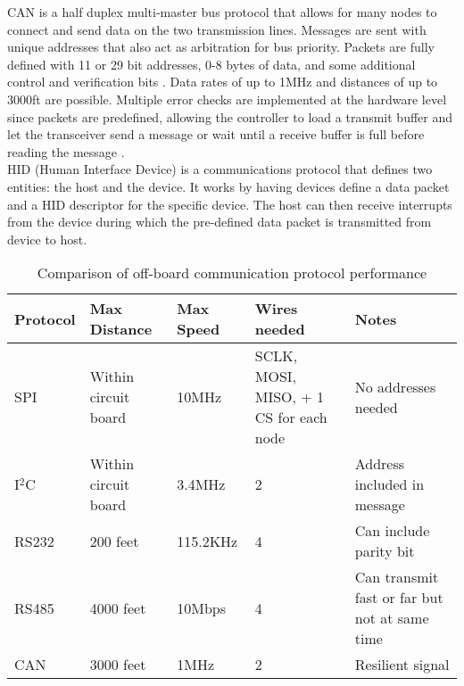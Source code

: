 \newline
CAN is a half duplex multi-master bus protocol that allows for many nodes to connect and send data on the two transmission lines. Messages are sent with unique addresses that also act as arbitration for bus priority. Packets are fully defined with 11 or 29 bit addresses, 0-8 bytes of data, and some additional control and verification bits \cite{CAN_Guide,CAN_Requirements}. Data rates of up to 1MHz and distances of up to 3000ft are possible. Multiple error checks are implemented at the hardware level since packets are predefined, allowing the controller to load a transmit buffer and let the transceiver send a message or wait until a receive buffer is full before reading the message \cite{CANvSPI}. \\
\newline
HID (Human Interface Device) is a communications protocol\cite{HIDdevice} that defines two entities: the host and the device.  It works by having devices define a data packet and a HID descriptor for the specific device. The host can then receive interrupts from the device during which the pre-defined data packet is transmitted from device to host.  

\begin{table}[H]
	\begin{center}
		\caption{Comparison of off-board communication protocol performance}
		\label{tbl:Comm_Compare}
		\begin{tabular} {| l | l | p{2cm} | p{2.5cm} | p{2.5cm} |}
			\hline
			Protocol & Max Distance & Max Speed & Wires needed & Notes \\ \hline
			SPI & Within circuit board & 10MHz & SCLK, MOSI, MISO, + 1 CS for each node & No addresses needed \\
			\hline
			I$^2$C & Within circuit board & 3.4MHz & 2 & Address included in message \\
			\hline
			RS232 & 200 feet & 115.2KHz & 4 & Can include parity bit \\
			\hline
			RS485 & 4000 feet & 10Mbps & 4 & Can transmit fast or far but not at same time \\
			\hline
			CAN & 3000 feet & 1MHz & 2 & Resilient signal \\
			\hline
		\end{tabular}
	\end{center}
\end{table}


